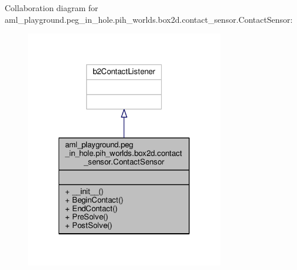 Collaboration diagram for aml\-\_\-playground.\-peg\-\_\-in\-\_\-hole.\-pih\-\_\-worlds.\-box2d.\-contact\-\_\-sensor.\-Contact\-Sensor\-:
\nopagebreak
\begin{figure}[H]
\begin{center}
\leavevmode
\includegraphics[width=246pt]{classaml__playground_1_1peg__in__hole_1_1pih__worlds_1_1box2d_1_1contact__sensor_1_1_contact_sensor__coll__graph}
\end{center}
\end{figure}
